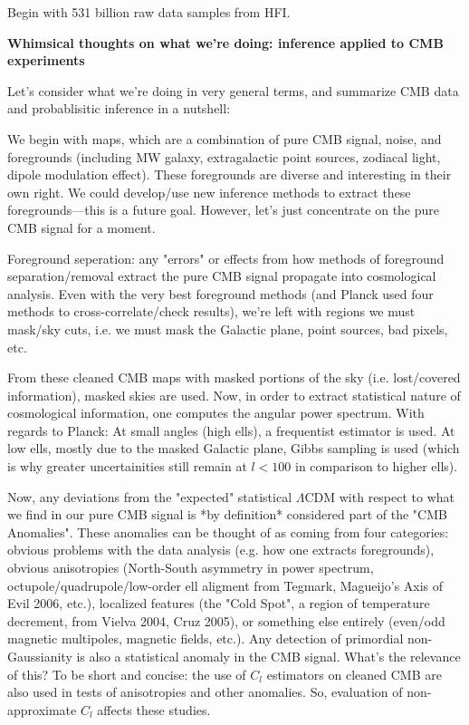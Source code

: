 \documentclass[a4paper, 11pt]{article}
\begin{document}
Begin with 531 billion raw data samples from HFI. 


\textbf{Whimsical thoughts on what we're doing: inference applied to CMB experiments}

Let's consider what we're doing in very general terms, and summarize CMB data and probablisitic inference in a nutshell:

We begin with maps, which are a combination of pure CMB signal, noise, and foregrounds (including MW galaxy, extragalactic point sources, zodiacal light, dipole modulation effect). These foregrounds are diverse and interesting in their own right. We could develop/use new inference methods to extract these foregrounds---this is a future goal. However, let's just concentrate on the pure CMB signal for a moment.  

Foreground seperation: any "errors" or effects from how methods of foreground separation/removal extract the pure CMB signal propagate into cosmological analysis. Even with the very best foreground methods (and Planck used four methods to cross-correlate/check results), we're left with regions we must mask/sky cuts, i.e. we must mask the Galactic plane, point sources, bad pixels, etc. 

From these cleaned CMB maps with masked portions of the sky (i.e. lost/covered information), masked skies are used. Now, in order to extract statistical nature of cosmological information, one computes the angular power spectrum. With regards to Planck: At small angles (high ells), a frequentist estimator is used. At low ells, mostly due to the masked Galactic plane, Gibbs sampling is used (which is why greater uncertainities still remain at $l<100$ in comparison to higher ells).

Now, any deviations from the "expected" statistical $\Lambda$CDM with respect to what we find in our pure CMB signal is *by definition* considered part of the "CMB Anomalies". These anomalies can be thought of as coming from four categories: obvious problems with the data analysis (e.g. how one extracts foregrounds), obvious anisotropies (North-South asymmetry in power spectrum, octupole/quadrupole/low-order ell aligment from Tegmark, Magueijo's Axis of Evil 2006, etc.), localized features (the "Cold Spot", a region of temperature decrement, from Vielva 2004, Cruz 2005), or something else entirely (even/odd magnetic multipoles, magnetic fields, etc.). Any detection of primordial non-Gaussianity is also a statistical anomaly in the CMB signal. What's the relevance of this? To be short and concise: the use of $C_l$ estimators on cleaned CMB are also used in tests of anisotropies and other anomalies. So, evaluation of non-approximate $C_l$ affects these studies. 
\end{document}
